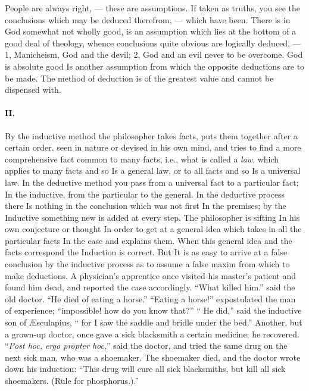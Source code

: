 \documentclass[12pt]{article}
\begin{document}

People are always right, --- these are assumptions. If 
taken as truths, you see the conclusions which may be 
deduced therefrom, --- which have been. There is in 
God somewhat not wholly good, is an assumption which 
lies at the bottom of a good deal of theology, whence 
conclusions quite obvious are logically deduced, --- 1, 
Manicheism, God and the devil; 2, God and an evil 
never to be overcome. God is absolute good Is another 
assumption from which the opposite deductions are to 
be made. The method of deduction is of the greatest 
value and cannot be dispensed with. 

\paragraph{II.} By the inductive method the philosopher takes 
facts, puts them together after a certain order, seen in 
nature or devised in his own mind, and tries to find a 
more comprehensive fact common to many facts, i.e., 
what is called a \emph{law}, which applies to many facts and 
so Is a general law, or to all facts and so Is a universal 
law. In the deductive method you pass from a universal fact to a particular fact; In the inductive, from 
the particular to the general. In the deductive process there Is nothing in the conclusion which was not 
first In the premises; by the Inductive something new 
is added at every step. The philosopher is sifting In 
his own conjecture or thought In order to get at a 
general idea which takes in all the particular facts In 
the case and explains them. When this general idea 
and the facts correspond the Induction is correct. But 
It is as easy to arrive at a false conclusion by the inductive process as to assume a false maxim from which 
to make deductions. A physician's apprentice once 
visited his master's patient and found him dead, and 
reported the case accordingly. ``What killed him.'' 
said the old doctor. ``He died of eating a horse.'' 
``Eating a horse!'' expostulated the man of experience; ``impossible! how do you know that?'' `` He 
did,'' said the inductive son of {\AE}sculapius, `` for I 
saw the saddle and bridle under the bed.'' Another, 
but a grown-up doctor, once gave a sick blacksmith a 
certain medicine; he recovered. ``\emph{Post hoc, ergo propter hoc},'' said the doctor, and tried the same drug on 
the next sick man, who was a shoemaker. The shoemaker died, and the doctor wrote down his induction: 
``This drug will cure all sick blacksmiths, but kill all 
sick shoemakers. (Rule for phosphorus.).'' 
\end{document}
